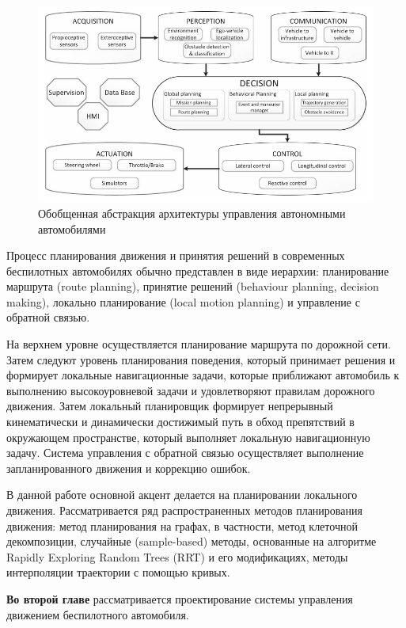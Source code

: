 \begin{figure}[h]
    \centering
    \includegraphics[width=\linewidth]{images/general_arch}
    \caption{Обобщенная абстракция архитектуры управления автономными автомобилями}
    \label{img:general_arch}
\end{figure}

Процесс планирования движения и принятия решений в современных беспилотных автомобилях обычно представлен в виде
иерархии: планирование маршрута (route planning), принятие решений (behaviour planning, decision making), локально планирование
(local motion planning) и управление с обратной связью.

На верхнем уровне осуществляется планирование маршрута по дорожной сети. Затем следуют уровень планирования
поведения, который принимает решения и формирует локальные навигационные задачи, которые приближают автомобиль
к выполнению высокоуровневой задачи и удовлетворяют правилам дорожного движения. Затем локальный планировщик
формирует непрерывный кинематически и динамически достижимый путь в обход препятствий в окружающем пространстве, который выполняет локальную навигационную задачу. Система
управления с обратной связью осуществляет выполнение запланированного движения и коррекцию ошибок. 

В данной работе основной акцент делается на планировании локального движения. Рассматривается ряд распространенных
методов планирования движения: метод планирования на графах, в частности, метод клеточной декомпозиции, случайные 
(sample-based) методы, основанные на алгоритме Rapidly Exploring Random Trees (RRT) и его модификациях, методы 
интерполяции траектории с помощью кривых.

\textbf{Во второй главе} рассматривается проектирование системы управления движением беспилотного автомобиля. 

